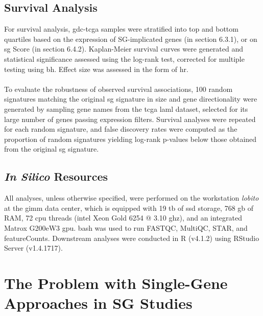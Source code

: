 \subsection{Survival Analysis}

For survival analysis, \gls{gdc}-\gls{tcga} samples\cite{network_cancer_nodate, heath_nci_2021} were stratified into top and bottom quartiles based on the expression of SG-implicated genes (in section 6.3.1), or on \gls{sg} Score (in section 6.4.2). Kaplan-Meier survival curves were generated and statistical significance assessed using the log-rank test\cite{goel_understanding_2010}, corrected for multiple testing using \gls{bh}. Effect size was assessed in the form of \gls{hr}.
\\
\\
To evaluate the robustness of observed survival associations, 100 random signatures matching the original \gls{sg} signature in size and gene directionality\cite{martins-silva_exploring_2025} were generated by sampling gene names from the \gls{tcga} \gls{laml} dataset\cite{network_cancer_nodate, heath_nci_2021}, selected for its large number of genes passing expression filters. Survival analyses were repeated for each random signature, and false discovery rates were computed as the proportion of random signatures yielding log-rank p-values below those obtained from the original \gls{sg} signature.


\subsection{\textit{In Silico} Resources}

All analyses, unless otherwise specified, were performed on the workstation \textit{lobito} at the \gls{gimm} data center, which is equipped with 19 \gls{tb} of \gls{ssd} storage, 768 \gls{gb} of RAM, 72 \gls{cpu} threads (\gls{intel} Xeon
Gold 6254 @ 3.10 \gls{ghz}), and an integrated Matrox G200eW3 \gls{gpu}. \gls{bash} was used to run FASTQC\cite{andrews_fastqc_2010}, MultiQC\cite{ewels_multiqc_2016}, STAR\cite{dobin_star_2013}, and featureCounts\cite{liao_featurecounts_2014}. Downstream analyses were conducted in R (v4.1.2) using RStudio Server (v1.4.1717). 

\section{The Problem with Single-Gene Approaches in SG Studies}
